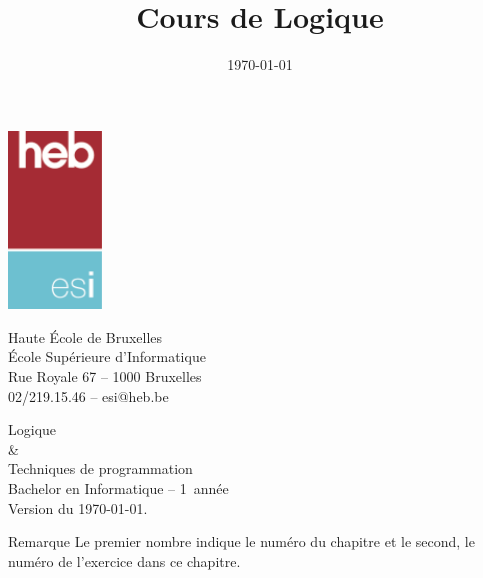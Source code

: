 \documentclass[a4paper,oneside]{book}
\title{Cours de Logique \annee}
\author{}
\date{\today}
\makeatletter
\newcommand{\ecole}{Haute École de Bruxelles}
\newcommand{\entite}{École Supérieure d'Informatique}
\newcommand{\entiteadresse}{Rue Royale 67 – 1000 Bruxelles}
\newcommand{\entitetel}{02/219.15.46}
\newcommand{\entitemail}{esi@heb.be}
\newcommand{\etude}{Bachelor en Informatique}
\newcommand{\cours}{Logique\\\&\\Techniques de programmation}
\newcommand{\annee}{1\up{ère}}
\makeatother
\begin{document}
	

\thispagestyle{empty}
\begin{minipage}{3cm}
	\includegraphics[width=25mm]{image/logo-esi}
\end{minipage}
\begin{minipage}{13cm}
\vspace{-6\baselineskip}
\sffamily
\Large\ecole\\\entite
\bigskip\\
\large\entiteadresse\\\entitetel{} – \entitemail
\end{minipage}

\vfill

\begin{center}
\sffamily
\Huge\cours{}
\bigskip\\
\Large\etude{} -- \annee\ année\\
\small Version du \today.{}
\end{center}



\vfill{}
{
\color{MidnightBlue}
}
\vfill{}

\clearpage{}

\begin{Emphase}{Remarque}
Le premier nombre indique le numéro du chapitre
et le second, le numéro de l'exercice dans ce chapitre.
\end{Emphase}


\end{document}
